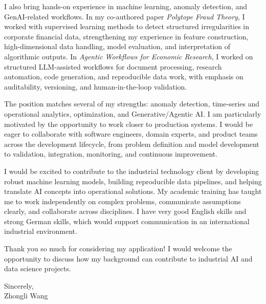 \documentclass[11pt]{article}
\begin{document}
I also bring hands-on experience in machine learning, anomaly detection, and GenAI-related workflows. In my co-authored paper \emph{Polytope Fraud Theory}, I worked with supervised learning methods to detect structured irregularities in corporate financial data, strengthening my experience in feature construction, high-dimensional data handling, model evaluation, and interpretation of algorithmic outputs. In \emph{Agentic Workflows for Economic Research}, I worked on structured LLM-assisted workflows for document processing, research automation, code generation, and reproducible data work, with emphasis on auditability, versioning, and human-in-the-loop validation.

The position matches several of my strengths: anomaly detection, time-series and operational analytics, optimization, and Generative/Agentic AI. I am particularly motivated by the opportunity to work closer to production systems. I would be eager to collaborate with software engineers, domain experts, and product teams across the development lifecycle, from problem definition and model development to validation, integration, monitoring, and continuous improvement.

I would be excited to contribute to the industrial technology client by developing robust machine learning models, building reproducible data pipelines, and helping translate AI concepts into operational solutions. My academic training has taught me to work independently on complex problems, communicate assumptions clearly, and collaborate across disciplines. I have very good English skills and strong German skills, which would support communication in an international industrial environment.

Thank you so much for considering my application! I would welcome the opportunity to discuss how my background can contribute to industrial AI and data science projects.

\vspace{0.15cm}

\noindent Sincerely, \\[0.5cm]
\noindent Zhongli Wang
\end{document}
